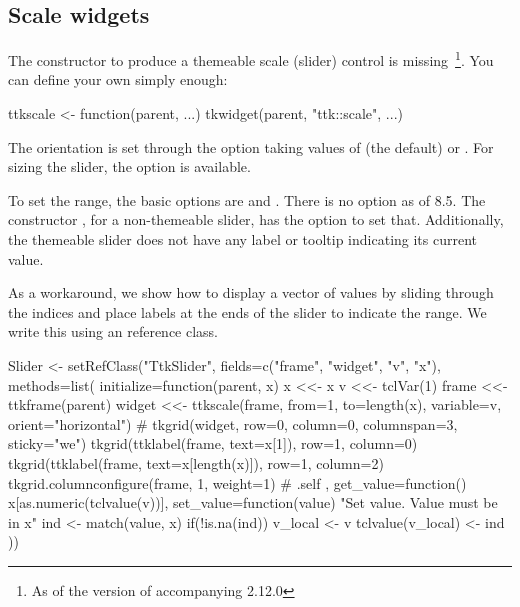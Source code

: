 \subsection{Scale widgets}
\label{sec:tcltk:scale-widgets}

The  constructor to produce a themeable scale
(slider) control is missing~\footnote{As of the version of 
  accompanying \R{} 2.12.0}. You can define your own simply enough:
\begin{Schunk}
\begin{Sinput}
 ttkscale <- function(parent, ...) 
   tkwidget(parent, "ttk::scale", ...)
\end{Sinput}
\end{Schunk}

The orientation is set through the option 
taking values of  (the default) or
. For sizing the slider, the 
option is available.  

To set the range, the basic options are  and
. There is no  option as of \TK\/
8.5. The constructor , for a non-themeable slider,
has the option  to set that. Additionally,
the themeable slider does not have any label or tooltip indicating its
current value.


As a workaround, we show how to display a vector of values by
sliding through the indices and place labels at the ends of the slider
to indicate the range. We write this using an \R{} reference class. 

\begin{Schunk}
\begin{Sinput}
 Slider <-
   setRefClass("TtkSlider",
      fields=c("frame", "widget", "v", "x"),
      methods=list(
        initialize=function(parent, x) {
          x <<- x
          v <<- tclVar(1)
          frame <<- ttkframe(parent)
          widget <<- ttkscale(frame, from=1, to=length(x),
                              variable=v, orient="horizontal")
          #
          tkgrid(widget, row=0, column=0, columnspan=3, 
                 sticky="we")
          tkgrid(ttklabel(frame, text=x[1]), 
                 row=1, column=0)
          tkgrid(ttklabel(frame, text=x[length(x)]), 
                 row=1, column=2)
          tkgrid.columnconfigure(frame, 1, weight=1)
          #
          .self
        },
        get_value=function() x[as.numeric(tclvalue(v))],
        set_value=function(value) {
          "Set value. Value must be in x"
          ind <- match(value, x)
          if(!is.na(ind)) {
            v_local <- v
            tclvalue(v_local) <- ind
          }
        }
        ))
\end{Sinput}
\end{Schunk}

